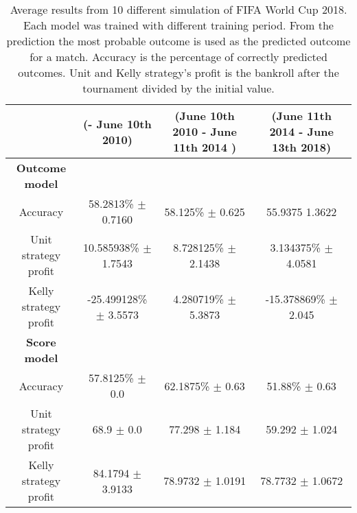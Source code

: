 \begin{sidewaystable}
    \caption{Average results from 10 different simulation of FIFA World Cup 2018. Each model was trained with different training period. From the prediction the most probable outcome is used as the predicted outcome for a match. Accuracy is the percentage of correctly predicted outcomes. Unit and Kelly strategy's profit is the bankroll after the tournament divided by the initial value.}
    \begin{tabular}{ | c |c| c | c |}
    \hline
    & (- June 10th 2010) & (June 10th 2010 - June 11th 2014 ) & (June 11th 2014 - June 13th 2018) \\
    \hline
    \textbf{Outcome model} \\
    \hline
    Accuracy & 58.2813\% $\pm$ 0.7160 & 58.125\% $\pm$ 0.625 & 55.9375 1.3622 \\
    Unit strategy profit& 10.585938\% $\pm$ 1.7543 & 8.728125\% $\pm$ 2.1438 & 3.134375\% $\pm$ 4.0581 \\
    Kelly strategy profit& -25.499128\% $\pm$ 3.5573 & 4.280719\% $\pm$ 5.3873 & -15.378869\% $\pm$ 2.045 \\
    \hline
    \textbf{Score model} \\
    \hline
    Accuracy & 57.8125\% $\pm$ 0.0 & 62.1875\% $\pm$ 0.63 & 51.88\% $\pm$ 0.63 \\
    Unit strategy profit& 68.9 $\pm$ 0.0 & 77.298 $\pm$ 1.184 & 59.292 $\pm$ 1.024 \\
    Kelly strategy profit& 84.1794 $\pm$ 3.9133 & 78.9732 $\pm$ 1.0191 & 78.7732 $\pm$ 1.0672 \\
    \hline
   \end{tabular}
\end{sidewaystable}